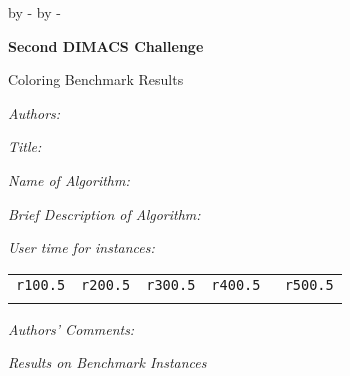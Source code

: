 % 
%
\topmargin 0pt
\advance \topmargin by -\headheight
\advance \topmargin by -\headsep
     
\textheight 8.9in
     
\oddsidemargin 0pt
\evensidemargin \oddsidemargin
\marginparwidth 0.5in
     
\textwidth 6.5in

\centerline{\bf Second DIMACS Challenge}
\centerline{Coloring Benchmark Results}
{\it Authors: }    \par
{\it Title: }      \par
{\it Name of Algorithm: }       \par
{\it Brief Description of Algorithm: } \par

\bigskip
{} \par
{} \par

\bigskip
{}

{\it User time for instances:}

\begin{center}
\begin{tabular}{rrrrr}\hline
{\tt r100.5}&{\tt r200.5}&{\tt r300.5}&{\tt r400.5}&{\tt
  r500.5}\\
   &   &   &  &   \\\hline
\end{tabular}
\end{center}

\bigskip
{}

{\it Authors' Comments:}
\newpage

{\it Results on Benchmark Instances}

